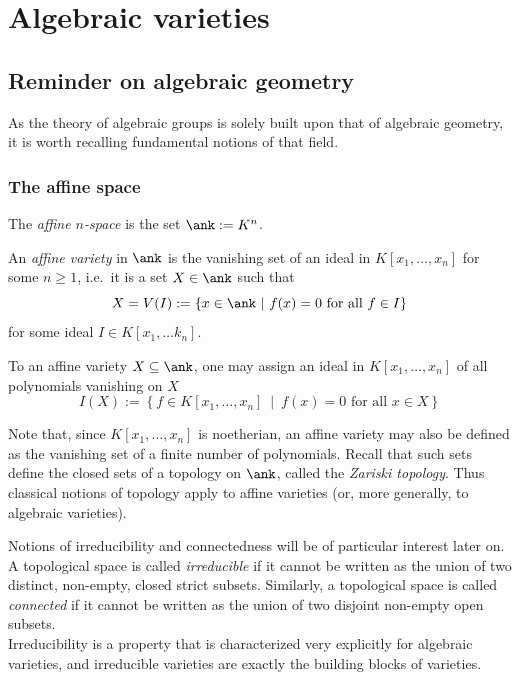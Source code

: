 \section{Algebraic varieties}
\subsection{Reminder on algebraic geometry}
As the theory of algebraic groups is solely built upon that of algebraic geometry, it is worth recalling fundamental notions of that field. 

\subsubsection{The affine space}

\begin{defn}
    The \emph{affine $n$-space} is the set $\ank := K^n$.

    An \emph{affine variety} in $\ank$ is the vanishing set of an ideal in $K\left[x_1, \ldots, x_n\right]$ for some $n \geq 1$, i.e.\ it is a set $X \in \ank$ such that
    \[ X = V(I) := \left\{x \in \ank \ \middle| \  f(x) = 0 \text{ for all } f\in I\right\} \]
    for some ideal $I \in K[x_1, \ldots k_n]$.

    To an affine variety $X \subseteq \ank$, one may assign an ideal in $K\left[x_1, \ldots, x_n\right]$ of all polynomials vanishing on $X$
    \[I(X) := \left\{f \in K\left[x_1, \ldots, x_n\right] \ \middle| \  f(x) = 0 \text{ for all } x\in X\right\} \]
\end{defn}


Note that, since $K\left[x_1, \ldots, x_n\right]$ is noetherian, an affine variety may also be defined as the vanishing set of a finite number of polynomials. Recall that such sets define the closed sets of a topology on $\ank$, called the \emph{Zariski topology}. Thus classical notions of topology apply to affine varieties (or, more generally, to algebraic varieties). 

Notions of irreducibility and connectedness will be of particular interest later on. A topological space is called \emph{irreducible} if it cannot be written as the union of two distinct, non-empty, closed strict subsets. Similarly, a topological space is called \emph{connected} if it cannot be written as the union of two disjoint non-empty open subsets. \\
Irreducibility is a property that is characterized very explicitly for algebraic varieties, and irreducible varieties are exactly the building blocks of varieties.

